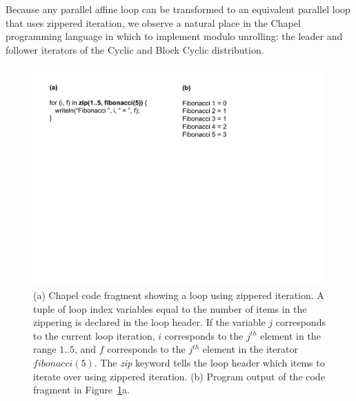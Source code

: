 Because any parallel affine loop can be transformed to an equivalent parallel loop that uses zippered iteration, we observe a natural place in the Chapel programming language in which to implement modulo unrolling: the leader and follower iterators of the Cyclic and Block Cyclic distribution. 

\begin{figure}
	\begin{center}
	\includegraphics[scale=0.60]{./Figures/zippered_iteration}
	\caption{(a) Chapel code fragment showing a loop using zippered iteration. A tuple of loop index variables equal to the number of items in the zippering is declared in the loop header. If the variable $j$ corresponds to the current loop iteration, $i$ corresponds to the $j^{th}$ element in the range $1..5$, and $f$ corresponds to the $j^{th}$ element in the iterator $fibonacci(5)$. The \textit{zip} keyword tells the loop header which items to iterate over using zippered iteration. (b) Program output of the code fragment in Figure~\ref{zippered_iteration}a.}
	\label{zippered_iteration}
	\end{center}
\end{figure}

